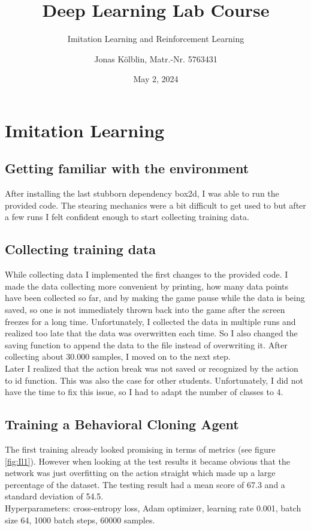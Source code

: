 \documentclass[10pt]{scrartcl}
\begin{document}
\title{Deep Learning Lab Course}
\subtitle{Imitation Learning and Reinforcement Learning}
\author{Jonas Kölblin, Matr.-Nr. 5763431}
\date{May 2, 2024}
\maketitle



\section{Imitation Learning}
\subsection{Getting familiar with the environment}
After installing the last stubborn dependency box2d, I was able to run the provided code. The stearing mechanics were a bit difficult to get used to but after a few runs I felt confident enough to start collecting training data. 

\subsection{Collecting training data}
While collecting data I implemented the first changes to the provided code. I made the data collecting more convenient by printing, how many data points have been collected so far, and by making the game pause while the data is being saved, so one is not immediately thrown back into the game after the screen freezes for a long time. Unfortunately, I collected the data in multiple runs and realized too late that the data was overwritten each time. So I also changed the saving function to append the data to the file instead of overwriting it. After collecting about 30.000 samples, I moved on to the next step. \\
Later I realized that the action \dq break\dq{} was not saved or recognized by the action to id function. This was also the case for other students. Unfortunately, I did not have the time to fix this issue, so I had to adapt the number of classes to 4.

\subsection{Training a Behavioral Cloning Agent}
The first training already looked promising in terms of metrics (see figure \ref{fig:Il1}). However when looking at the test results it became obvious that the network was just overfitting on the action \dq straight\dq{} which made up a large percentage of the dataset. The testing result had a mean score of 67.3 and a standard deviation of 54.5. \\
Hyperparameters: cross-entropy loss, Adam optimizer, learning rate 0.001, batch size 64, 1000 batch steps, 60000 samples.
\end{document}
